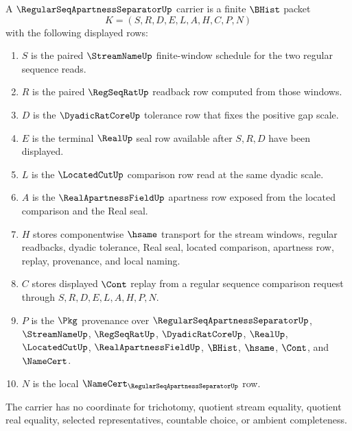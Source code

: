\begin{definition}
\label{def:regular-seq-apartness-separator-carrier}
A $\RegularSeqApartnessSeparatorUp$ carrier is a finite $\BHist$ packet
$$
K=(S,R,D,E,L,A,H,C,P,N)
$$
with the following displayed rows:
\begin{enumerate}
\item $S$ is the paired $\StreamNameUp$ finite-window schedule for the two regular sequence reads.
\item $R$ is the paired $\RegSeqRatUp$ readback row computed from those windows.
\item $D$ is the $\DyadicRatCoreUp$ tolerance row that fixes the positive gap scale.
\item $E$ is the terminal $\RealUp$ seal row available after $S,R,D$ have been displayed.
\item $L$ is the $\LocatedCutUp$ comparison row read at the same dyadic scale.
\item $A$ is the $\RealApartnessFieldUp$ apartness row exposed from the located comparison and the Real seal.
\item $H$ stores componentwise $\hsame$ transport for the stream windows, regular readbacks, dyadic tolerance, Real seal, located comparison, apartness row, replay, provenance, and local naming.
\item $C$ stores displayed $\Cont$ replay from a regular sequence comparison request through $S,R,D,E,L,A,H,P,N$.
\item $P$ is the $\Pkg$ provenance over $\RegularSeqApartnessSeparatorUp$, $\StreamNameUp$, $\RegSeqRatUp$, $\DyadicRatCoreUp$, $\RealUp$, $\LocatedCutUp$, $\RealApartnessFieldUp$, $\BHist$, $\hsame$, $\Cont$, and $\NameCert$.
\item $N$ is the local $\NameCert_{\RegularSeqApartnessSeparatorUp}$ row.
\end{enumerate}
The carrier has no coordinate for trichotomy, quotient stream equality, quotient real equality, selected representatives, countable choice, or ambient completeness.
\end{definition}

